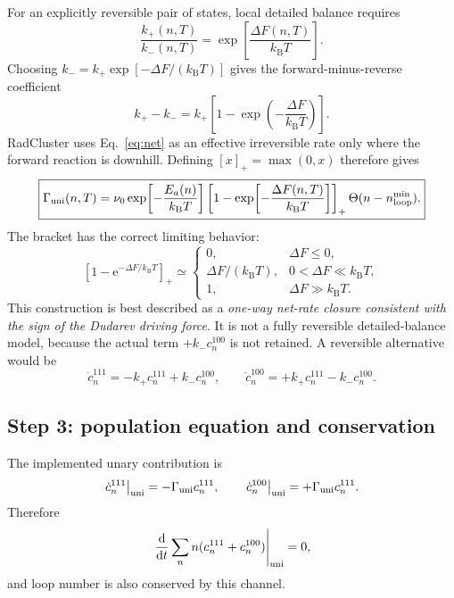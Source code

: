 \documentclass[11pt,a4paper]{article}
\newcommand{\kb}{k_{\mathrm B}}
\newcommand{\pos}[1]{\left[#1\right]_{+}}
\newcommand{\dd}{\mathrm d}
\newcommand{\e}{\mathrm e}
\newcommand{\rc}{\textsf{RadCluster}}
\begin{document}
For an explicitly reversible pair of states, local detailed balance requires
\begin{equation}
 \frac{k_+(n,T)}{k_-(n,T)}=
 \exp\!\left[\frac{\Delta F(n,T)}{\kb T}\right].                     \label{eq:DB}
\end{equation}
Choosing $k_-=k_+\exp[-\Delta F/(\kb T)]$ gives the forward-minus-reverse
coefficient
\begin{equation}
 k_+-k_-=k_+\left[1-\exp\!\left(-\frac{\Delta F}{\kb T}\right)\right]. \label{eq:net}
\end{equation}
\rc{} uses Eq.~\eqref{eq:net} as an effective irreversible rate only where the
forward reaction is downhill.  Defining $[x]_+=\max(0,x)$ therefore gives
\begin{equation}
 \boxed{
 \Gamma_{\rm uni}(n,T)=\nu_0\exp\!\left[-\frac{E_a(n)}{\kb T}\right]
 \pos{1-\exp\!\left[-\frac{\Delta F(n,T)}{\kb T}\right]}
 \Theta(n-n_{\rm loop}^{\min}) .}                                    \label{eq:Gamma}
\end{equation}
The bracket has the correct limiting behavior:
\begin{equation}
 \pos{1-\e^{-\Delta F/\kb T}}\simeq
 \begin{cases}
   0, & \Delta F\le0,\\
   \Delta F/(\kb T), & 0<\Delta F\ll\kb T,\\
   1, & \Delta F\gg\kb T.
 \end{cases}                                                         \label{eq:gateLimits}
\end{equation}
This construction is best described as a \emph{one-way net-rate closure
consistent with the sign of the Dudarev driving force}.  It is not a fully
reversible detailed-balance model, because the actual term
$+k_-c_n^{100}$ is not retained.  A reversible alternative would be
\begin{equation}
 \dot c_n^{111}=-k_+c_n^{111}+k_-c_n^{100},\qquad
 \dot c_n^{100}=+k_+c_n^{111}-k_-c_n^{100}.                            \label{eq:reversible}
\end{equation}

\subsection{Step 3: population equation and conservation}

The implemented unary contribution is
\begin{equation}
 \left.\dot c_n^{111}\right|_{\rm uni}=-\Gamma_{\rm uni}c_n^{111},
 \qquad
 \left.\dot c_n^{100}\right|_{\rm uni}=+\Gamma_{\rm uni}c_n^{111}.   \label{eq:uniME}
\end{equation}
Therefore
\begin{equation}
 \left.\frac{\dd}{\dd t}\sum_n n(c_n^{111}+c_n^{100})\right|_{\rm uni}=0, \label{eq:uniCons}
\end{equation}
and loop number is also conserved by this channel.
\end{document}
